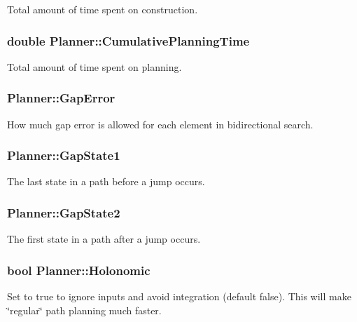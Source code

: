 Total amount of time spent on construction.

\subsubsection{\setlength{\rightskip}{0pt plus 5cm}double Planner::Cumulative\-Planning\-Time}\label{classPlanner_m0}


Total amount of time spent on planning.

\subsubsection{ Planner::Gap\-Error}\label{classPlanner_m11}


How much gap error is allowed for each element in bidirectional search.

\subsubsection{ Planner::Gap\-State1}\label{classPlanner_m8}


The last state in a path before a jump occurs.

\subsubsection{ Planner::Gap\-State2}\label{classPlanner_m9}


The first state in a path after a jump occurs.

\subsubsection{\setlength{\rightskip}{0pt plus 5cm}bool Planner::Holonomic}\label{classPlanner_m10}


Set to true to ignore inputs and avoid integration (default false). This will make \char`\"{}regular\char`\"{} path planning much faster.

